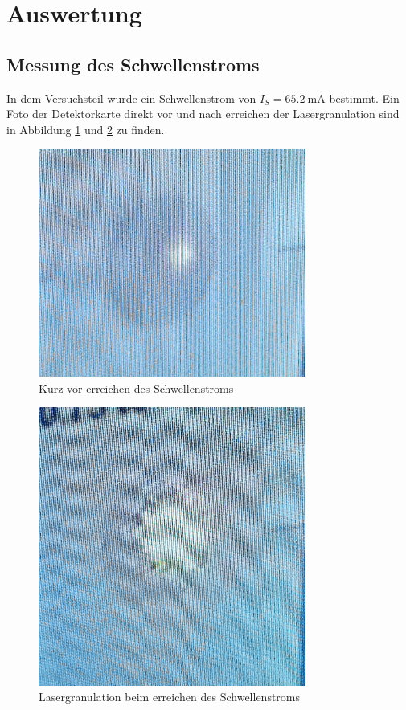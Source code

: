 \section{Auswertung}
\label{sec:Auswertung}
\subsection{Messung des Schwellenstroms}
In dem Versuchsteil wurde ein Schwellenstrom von $I_S = \SI{65.2}{\milli\ampere}$ bestimmt. Ein Foto der Detektorkarte direkt vor und nach erreichen der Lasergranulation sind in Abbildung \ref{pic:vschw} und \ref{pic:nschw}
zu finden.
\begin{figure}
    \centering
    \includegraphics[width = 0.78\textwidth]{pictures/vschw.png}
    \caption{Kurz vor erreichen des Schwellenstroms}
    \label{pic:vschw}
\end{figure}
\begin{figure}
    \centering
    \includegraphics[width = 0.78\textwidth]{pictures/nschwelle.png}
    \caption{Lasergranulation beim erreichen des Schwellenstroms}
    \label{pic:nschw}
\end{figure}

